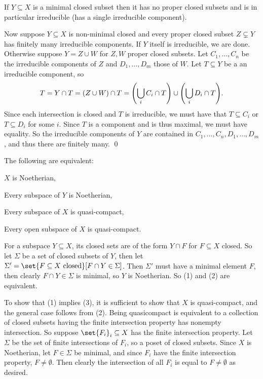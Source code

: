     If $Y\subseteq X$ is a minimal closed subset then it has no proper closed subsets and is in particular irreducible (has a single irreducible
    component).

    Now suppose $Y\subseteq X$ is non-minimal closed and every proper closed subset $Z\subsetneq Y$ has finitely many irreducible components.
    If $Y$ itself is irreducible, we are done.
    Otherwise suppose $Y=Z\cup W$ for $Z,W$ proper closed subsets.
    Let $C_1,\dots,C_n$ be the irreducible components of $Z$ and $D_1,\dots,D_m$ those of $W$.
    Let $T\subseteq Y$ be a an irreducible component, so
    $$ T = Y\cap T = (Z\cup W)\cap T = \mathopen{}\mathclose{\left(\bigcup_i C_i\cap T\right)}\cup\mathopen{}\mathclose{\left(\bigcup_i D_i\cap T\right)} . $$
    Since each intersection is closed and $T$ is irreducible, we must have that $T\subseteq C_i$ or $T\subseteq D_i$ for some $i$.
    Since $T$ is a component and is thus maximal, we must have equality.
    So the irreducible components of $Y$ are contained in $C_1,\dots,C_n,D_1,\dots,D_m$, and thus there are finitely many.
    \qed

\eproof

\blemm

    The following are equivalent:
    \benum
        \item $X$ is Noetherian,
        \item Every subspace of $Y$ is Noetherian,
        \item Every subspace of $X$ is quasi-compact,
        \item Every open subspace of $X$ is quasi-compact.
    \eenum

\elemm

\bproof

    For a subspace $Y\subseteq X$, its closed sets are of the form $Y\cap F$ for $F\subseteq X$ closed.
    So let $\Sigma$ be a set of closed subsets of $Y$, then let $\Sigma'=\set{F\subseteq X\hbox{ closed}}[F\cap Y\in\Sigma]$.
    Then $\Sigma'$ must have a minimal element $F$, then clearly $F\cap Y\in\Sigma$ is minimal, so $Y$ is Noetherian.
    So (1) and (2) are equivalent.

    To show that (1) implies (3), it is sufficient to show that $X$ is quasi-compact, and the general case follows from (2).
    Being quasicompact is equivalent to a collection of closed subsets having the finite intersection property has nonempty intersection.
    So suppose $\set{F_i}_i\subseteq X$ has the finite intersection property.
    Let $\Sigma$ be the set of finite intersections of $F_i$, so a poset of closed subsets.
    Since $X$ is Noetherian, let $F\in\Sigma$ be minimal, and since $F_i$ have the finite intersection property, $F\neq\emptyset$.
    Then clearly the intersection of all $F_i$ is equal to $F\neq\emptyset$ as desired.

